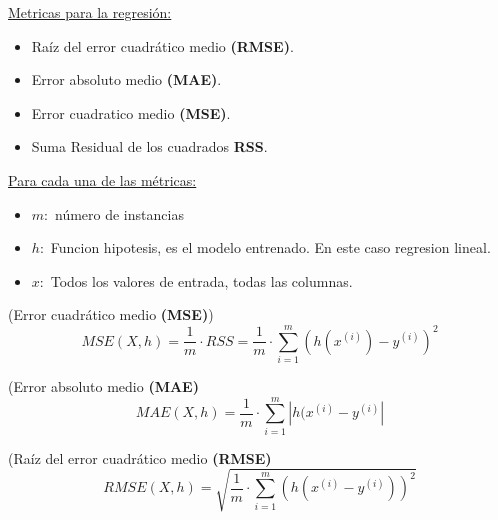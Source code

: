 \documentclass[../main.tex]{subfiles}
\begin{document}
        \underline{Metricas para la regresión:}
        \begin{itemize}
            \item Raíz del error cuadrático medio \textbf{(RMSE)}.
            \item Error absoluto medio \textbf{(MAE)}.
            \item Error cuadratico medio \textbf{(MSE)}.
            \item Suma Residual de los cuadrados \textbf{RSS}.
        \end{itemize}
    
        \underline{Para cada una de las métricas:}
        \begin{itemize}
            \item $m:$ número de instancias
            \item $h:$ Funcion hipotesis, es el modelo entrenado. En este caso regresion lineal.
            \item $x:$ Todos los valores de entrada, todas las columnas.
        \end{itemize}
        
        \begin{definition} (Error cuadrático medio \textbf{(MSE)})
            \begin{equation}
                MSE(X, h) = \frac{1}{m} \cdot RSS = \frac{1}{m} \cdot \sum_{i=1}^{m} (h(x^{(i)}) - y^{(i)})^2
            \end{equation}
        \end{definition}
        
        \begin{definition} (Error absoluto medio \textbf{(MAE)}
            \begin{equation}
                MAE(X, h) = \frac{1}{m} \cdot \sum_{i=1}^{m} |h(x^{(i)} - y^{(i)}|
            \end{equation}
        \end{definition}

        \begin{definition} (Raíz del error cuadrático medio \textbf{(RMSE)}
            \begin{equation}
                RMSE(X, h) = \sqrt{\frac{1}{m} \cdot \sum_{i=1}^{m}(h(x^{(i)}-y^{(i)}))^2}
            \end{equation} 
        \end{definition}
\end{document}
